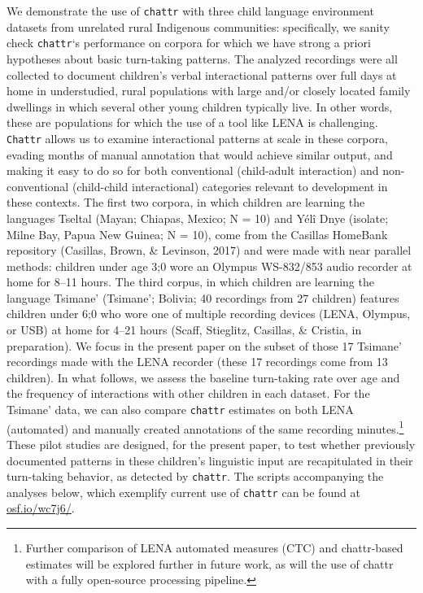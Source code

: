 \documentclass[10pt, letterpaper]{article}
\begin{document}
We demonstrate the use of \texttt{chattr} with three child language
environment datasets from unrelated rural Indigenous communities:
specifically, we sanity check \texttt{chattr}`s performance on corpora
for which we have strong a priori hypotheses about basic turn-taking
patterns. The analyzed recordings were all collected to document
children's verbal interactional patterns over full days at home in
understudied, rural populations with large and/or closely located family
dwellings in which several other young children typically live. In other
words, these are populations for which the use of a tool like LENA is
challenging. \texttt{Chattr} allows us to examine interactional patterns
at scale in these corpora, evading months of manual annotation that
would achieve similar output, and making it easy to do so for both
conventional (child-adult interaction) and non-conventional (child-child
interactional) categories relevant to development in these contexts. The
first two corpora, in which children are learning the languages Tseltal
(Mayan; Chiapas, Mexico; N = 10) and Yélî Dnye (isolate; Milne Bay,
Papua New Guinea; N = 10), come from the Casillas HomeBank repository
(Casillas, Brown, \& Levinson, 2017) and were made with near parallel
methods: children under age 3;0 wore an Olympus WS-832/853 audio
recorder at home for 8--11 hours. The third corpus, in which children
are learning the language Tsimane' (Tsimane'; Bolivia; 40 recordings
from 27 children) features children under 6;0 who wore one of multiple
recording devices (LENA, Olympus, or USB) at home for 4--21 hours
(Scaff, Stieglitz, Casillas, \& Cristia, in preparation). We focus in
the present paper on the subset of those 17 Tsimane' recordings made
with the LENA recorder (these 17 recordings come from 13 children). In
what follows, we assess the baseline turn-taking rate over age and the
frequency of interactions with other children in each dataset. For the
Tsimane' data, we can also compare \texttt{chattr} estimates on both
LENA (automated) and manually created annotations of the same recording
minutes.\footnote{Further comparison of LENA automated measures (CTC)
  and chattr-based estimates will be explored further in future work, as
  will the use of chattr with a fully open-source processing pipeline.}
These pilot studies are designed, for the present paper, to test whether
previously documented patterns in these children's linguistic input are
recapitulated in their turn-taking behavior, as detected by
\texttt{chattr}. The scripts accompanying the analyses below, which
exemplify current use of \texttt{chattr} can be found at
\href{https://osf.io/wc7j6/}{osf.io/wc7j6/}.
\end{document}
